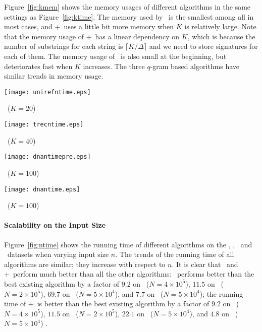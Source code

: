 Figure~\ref{fig:kmem} shows the memory usages of different algorithms in the same settings as Figure~\ref{fig:ktime}.  The memory used by \ebdjoin\ is the smallest among all in most cases, and \ebdjoin+\ uses a little bit more memory when $K$ is relatively large. Note that the memory usage of \ebdjoin+\ has a linear dependency on $K$, which is because the number of substrings for each string is $\lceil K/\Delta \rceil$ and we need to store signatures for each of them.  The memory usage of \pass\ is also small at the beginning, but deteriorates fast when $K$ increases.  The three $q$-gram based algorithms have similar trends in memory usage.  



\begin{figure*}[t]
\centering
\begin{minipage}[d]{0.4\linewidth}
\centering
\texttt{[image: unirefntime.eps]}
\centerline{\uniref\ ($K=20$)}
\end{minipage}
\begin{minipage}[d]{0.4\linewidth}
\centering
\texttt{[image: trecntime.eps]}
\centerline{\trec\ ($K=40$)}
\end{minipage}
\begin{minipage}[d]{0.4\linewidth}
\centering
\texttt{[image: dnantimepre.eps]}
\centerline{\genoaa\ ($K=100$)}
\end{minipage}
\begin{minipage}[d]{0.4\linewidth}
\centering
\texttt{[image: dnantime.eps]}
\centerline{\genoa\ ($K=100$)}
\end{minipage}
\caption{Running time, varying $n$.  Percentages on the curves for \ebdjoin/\ebdjoin+\  are their accuracy}
\label{fig:ntime}
\end{figure*}

\paragraph{Scalability on the Input Size}
Figure~\ref{fig:ntime} shows the running time of different algorithms on the \uniref, \trec, \genoaa\ and \genoa\ datasets when varying input size $n$. The trends of the running time of all algorithms are similar; they increase with respect to $n$.   It is clear that \ebdjoin\ and \ebdjoin+\ perform much better than all the other algorithms: \ebdjoin\ performs better than the best existing algorithm by a factor of $9.2$ on \uniref\ ($N = 4 \times 10^5$), $11.5$ on \trec\ ($N = 2 \times 10^5$), $69.7$ on \genoaa\ ($N = 5 \times 10^4$), and $7.7$ on \genoa\ ($N = 5 \times 10^4$);  the running time of \ebdjoin+\ is better than the best existing algorithm by a factor of $9.2$ on \uniref\ ($N = 4 \times 10^5$), $11.5$ on \trec\ ($N = 2 \times 10^5$), $22.1$ on \genoaa\ ($N = 5 \times 10^4$), and $4.8$ on \genoa\ ($N = 5 \times 10^4$) . 

